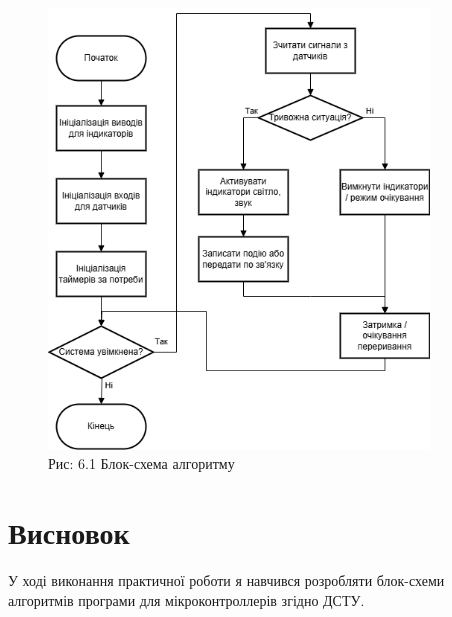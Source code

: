 \documentclass[a4paper]{article}
\begin{document}
\newpage

\begin{figure}[h]
    \centering
    \includegraphics[width=0.9\textwidth]{imgs/PW6.drawio.png}
    \caption*{Рис: 6.1 Блок-схема алгоритму }
\end{figure} 



\section*{Висновок}
У ході виконання практичної роботи я навчився  розробляти блок-схеми алгоритмів програми для мікроконтроллерів згідно ДСТУ.
\end{document}
